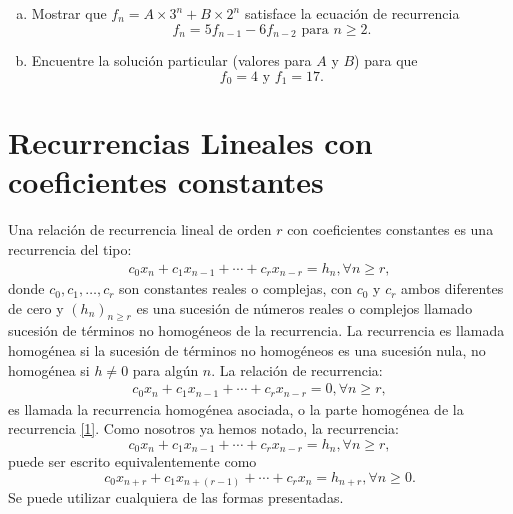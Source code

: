 \begin{solution}
	
\end{solution}

\begin{exercise}
\begin{enumerate}[(a)]
	\item Mostrar que $f_{n}=A\times3^{n}+B\times2^{n}$ satisface la ecuación de recurrencia \[ f_{n}=5f_{n-1}-6f_{n-2}\text{ para }n\geq 2. \]
	\item Encuentre la solución particular (valores para $A$ y $B$) para que \[ f_{0}=4\text{ y }f_{1}=17. \]
\end{enumerate}

\end{exercise}

\begin{solution}
	
\end{solution}

\section{Recurrencias Lineales con coeficientes constantes}

Una relación de recurrencia lineal de orden $r$ con coeficientes constantes es una recurrencia del tipo:
\begin{align}\label{1}
c_{0}x_{n}+c_{1}x_{n-1}+\cdots+c_{r}x_{n-r}=h_{n},\forall n\geq r,
\end{align}
donde $c_{0},c_{1},\ldots,c_{r}$ son constantes reales o complejas, con $c_{0}$ y $c_{r}$ ambos diferentes de cero y $(h_{n})_{n\geq r}$ es una sucesión de números reales o complejos llamado sucesión de términos no homogéneos de la recurrencia. La recurrencia es llamada homogénea si la sucesión de términos no homogéneos es una sucesión nula, no homogénea si $h\neq0 $ para algún $n$. La relación de recurrencia:
\begin{align}\label{2}
c_{0}x_{n}+c_{1}x_{n-1}+\cdots+c_{r}x_{n-r}=0,\forall n\geq r,
\end{align}
es llamada la recurrencia homogénea asociada, o la parte homogénea de la recurrencia \eqref{1}. Como nosotros ya hemos notado, la recurrencia:
\begin{equation*}
c_{0}x_{n}+c_{1}x_{n-1}+\cdots+c_{r}x_{n-r}=h_{n},\forall n\geq r,
\end{equation*}
puede ser escrito equivalentemente como
\begin{equation*}
c_{0}x_{n+r}+c_{1}x_{n+(r-1)}+\cdots+c_{r}x_{n}=h_{n+r},\forall n\geq 0.
\end{equation*}
Se puede utilizar cualquiera de las formas presentadas.

